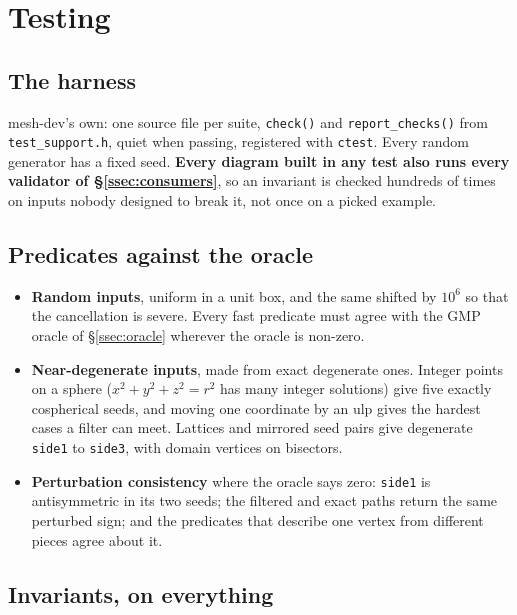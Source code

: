\documentclass[11pt,a4paper]{article}
\newcommand{\code}[1]{\texttt{#1}}          %
\newcommand{\secref}[1]{\S\ref{#1}}
\begin{document}
\section{Testing}\label{sec:testing}

\subsection{The harness}\label{ssec:harness}

mesh-dev's own: one source file per suite, \code{check()} and \code{report\_checks()} from
\code{test\_support.h}, quiet when passing, registered with \code{ctest}. Every random generator
has a fixed seed. \textbf{Every diagram built in any test also runs every validator of
\secref{ssec:consumers}}, so an invariant is checked hundreds of times on inputs nobody designed
to break it, not once on a picked example.

\subsection{Predicates against the oracle}\label{ssec:predtests}

\begin{itemize}
\item \textbf{Random inputs}, uniform in a unit box, and the same shifted by $10^6$ so that the
  cancellation is severe. Every fast predicate must agree with the GMP oracle of
  \secref{ssec:oracle} wherever the oracle is non-zero.
\item \textbf{Near-degenerate inputs}, made from exact degenerate ones. Integer points on a
  sphere ($x^2 + y^2 + z^2 = r^2$ has many integer solutions) give five exactly cospherical
  seeds, and moving one coordinate by an ulp gives the hardest cases a filter can meet. Lattices
  and mirrored seed pairs give degenerate \code{side1} to \code{side3}, with domain vertices on
  bisectors.
\item \textbf{Perturbation consistency} where the oracle says zero: \code{side1} is antisymmetric
  in its two seeds; the filtered and exact paths return the same perturbed sign; and the
  predicates that describe one vertex from different pieces agree about it.
\end{itemize}

\subsection{Invariants, on everything}\label{ssec:invariants}
\end{document}
